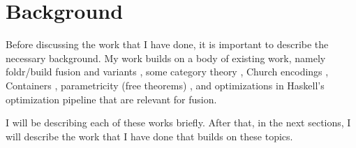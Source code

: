 
\section{Background}
Before discussing the work that I have done, it is important to describe the necessary background.
My work builds on a body of existing work, namely foldr/build fusion and variants \citep{Gill1993,Svenningsson2002,Coutts2007}, some category theory \citep{Ahrens2022}, Church encodings \citep{Harper2011}, Containers \citep{Abbott2005}, parametricity (free theorems) \citep{Wadler1989}, and optimizations in Haskell's optimization pipeline that are relevant for fusion.

I will be describing each of these works briefly.
After that, in the next sections, I will describe the work that I have done that builds on these topics.

\label{sec:catetgory_theory}


